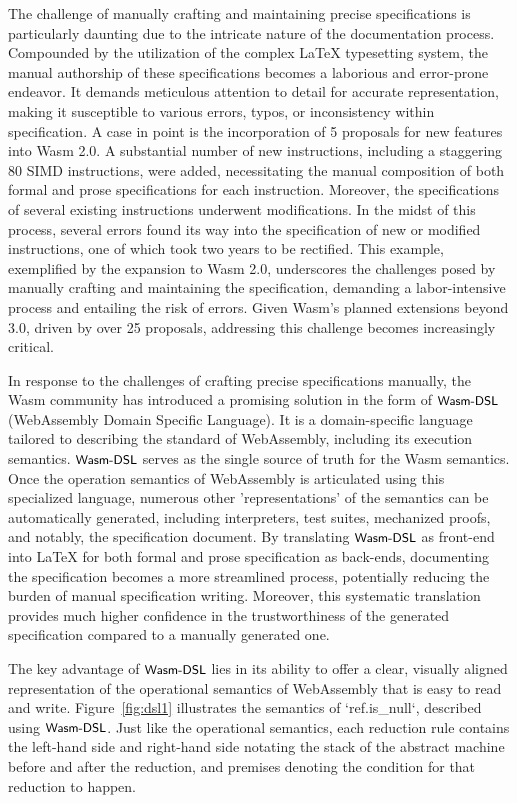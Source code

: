 The challenge of manually crafting and maintaining precise specifications is
particularly daunting due to the intricate nature of the documentation process.
Compounded by the utilization of the complex LaTeX typesetting system, the
manual authorship of these specifications becomes a laborious and error-prone
endeavor. It demands meticulous attention to detail for accurate
representation, making it susceptible to various errors, typos, or
inconsistency within specification. A case in point is the incorporation of 5
proposals for new features into Wasm 2.0. A substantial number of new
instructions, including a staggering 80 SIMD instructions, were added,
necessitating the manual composition of both formal and prose specifications
for each instruction. Moreover, the specifications of several existing
instructions underwent modifications. In the midst of this process, several
errors found its way into the specification of new or modified instructions,
one of which took two years to be rectified. This example, exemplified by the
expansion to Wasm 2.0, underscores the challenges posed by manually crafting and
maintaining the specification, demanding a labor-intensive process and
entailing the risk of errors. Given Wasm's planned extensions beyond 3.0,
driven by over 25 proposals, addressing this challenge becomes increasingly
critical.

In response to the challenges of crafting precise specifications manually, the
Wasm community has introduced a promising solution in the form of $\textsf{\small Wasm-DSL}$
(WebAssembly Domain Specific Language). It is a domain-specific language
tailored to describing the standard of WebAssembly, including its execution
semantics. $\textsf{\small Wasm-DSL}$ serves as the single source of truth for the Wasm semantics.
Once the operation semantics of WebAssembly is articulated using this
specialized language, numerous other 'representations' of the semantics can be
automatically generated, including interpreters, test suites, mechanized
proofs, and notably, the specification document.  By translating $\textsf{\small Wasm-DSL}$ as
front-end into LaTeX for both formal and prose specification as back-ends,
documenting the specification becomes a more streamlined process, potentially
reducing the burden of manual specification writing.  Moreover, this systematic
translation provides much higher confidence in the trustworthiness of the
generated specification compared to a manually generated one.

The key advantage of $\textsf{\small Wasm-DSL}$ lies in its ability to offer a clear, visually
aligned representation of the operational semantics of WebAssembly that is easy
to read and write. Figure~\ref{fig:dsl1} illustrates the semantics of
`ref.is\_null`, described using $\textsf{\small Wasm-DSL}$. Just like the operational semantics,
each reduction rule contains the left-hand side and right-hand side notating
the stack of the abstract machine before and after the reduction, and premises
denoting the condition for that reduction to happen.

